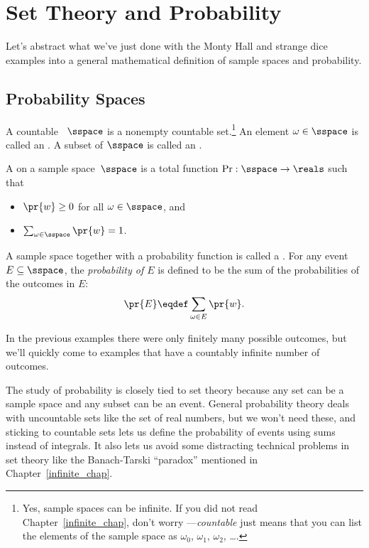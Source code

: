 \section{Set Theory and Probability}

Let's abstract what we've just done with the Monty Hall and strange
dice examples into a general mathematical definition of sample spaces
and probability.

\subsection{Probability Spaces}

\begin{definition}\label{LN12:sampsp}
  A countable ~$\sspace$ is a nonempty countable
  set.\footnote{Yes, sample spaces can be infinite.  If you did not
    read Chapter~\ref{infinite_chap}, don't worry ---\emph{countable}
    just means that you can list the elements of the sample space as
    $\omega_0$, $\omega_1$, $\omega_2$, \dots.}  An element $\omega \in \sspace$ is called
  an .  A subset of $\sspace$ is called an .
\end{definition}

\begin{definition}\label{LN12:probsp}
 A  on a sample space~$\sspace$ is a total
 function $\operatorname{Pr}: \sspace\to \reals$ such that
\begin{itemize}
\item $\pr{w} \geq 0$ for all $\omega \in \sspace$, and
\item $\sum_{\omega \in \sspace} \pr{w} = 1$.
\end{itemize}
A sample space together with a probability function is called a
.
For any event $E \subseteq \sspace$, the 
\emph{probability of $E$} is defined to be the sum of the probabilities of
the outcomes in $E$:
\[
    \pr{E} \eqdef \sum_{\omega \in E} \pr{w}.
\]
\end{definition}

In the previous examples there were only finitely many possible
outcomes, but we'll quickly come to examples that have a countably
infinite number of outcomes.

The study of probability is closely tied to set theory
because any set can be a sample space and any subset can be an event.
General probability theory deals with uncountable sets like the set of
real numbers, but we won't need these, and sticking to countable
sets lets us define the probability of events using sums instead of
integrals.  It also lets us avoid some distracting technical problems
in set theory like the Banach-Tarski ``paradox'' mentioned in
Chapter~\ref{infinite_chap}.


